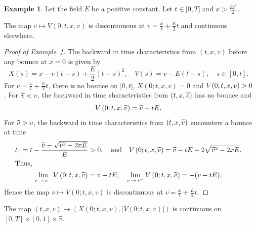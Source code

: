 \documentclass[10pt]{amsart}
\theoremstyle{definition}\newtheorem{defi}[theo]{Definition}\newtheorem{rema}[theo]{Remark}\newtheorem{exam}[theo]{Example}\newtheorem{exem}[theo]{Example}\newtheorem{nota}[theo]{Notation}
\newcommand{\R}{\mathbb{R}}
\let\oldtilde\tilde
\renewcommand*{\tilde}[1]{\mathchoice{\widetilde{#1}}{\widetilde{#1}}{\oldtilde{#1}}{\oldtilde{#1}}}
\begin{document}
\begin{exam}\label{ex-discontinuity-V(0)}
Let the field $E$ be a positive constant. Let $t\in] 0,T]$ and $x>\frac{Et^2}{2}$.

The map $v \mapsto V(0;t,x,v)$ is discontinuous at $v=\frac{x}{t}+\frac{E}{2}t$ and continuous elsewhere.
\end{exam}

\begin{proof}[{Proof of Example~\ref{ex-discontinuity-V(0)}}]
The backward in time characteristics from $(t,x,v)$ before any bounce at $x=0$ is given by
\[
X(s)= x-v(t-s)+\frac{E}{2}(t-s)^2, \quad V(s)= v-E(t-s), \quad s \in [0,t].
\]
For $v=\frac{x}{t}+\frac{E}{2}t$, there is no bounce on $]0,t]$, $X(0;t,x,v)=0$ and $V(0;t,x,v)\linebreak >0$. For $\tilde{v}<v$, the backward in time characteristics from $(t,x,\tilde{v})$ has no bounce and
\[
V\left(0;t,x,\tilde{v}\right)= \tilde{v}-tE.
\]
For $\tilde{v}>v$, the backward in time characteristics from $(t,x,\tilde{v})$ encounters a bounce at time
\begin{gather*}
t_1=t-\frac{\tilde{v}-\sqrt{\tilde{v}^2-2xE}}{E}>0,\quad \text{and}\quad V\left(0;t,x,\tilde{v}\right) = \tilde{v}-tE-2\sqrt{\tilde{v}^2-2xE}.
\\
\intertext{Thus,}
\lim _{\tilde{v}\,\to\,v^-}V\left(0;t,x,\tilde{v}\right)= v-tE, \quad \lim _{\tilde{v}\,\to\,v^+}V\left(0;t,x,\tilde{v}\right)= -(v-tE).
\end{gather*}
Hence the map $v \mapsto V(0;t,x,v)$ is discontinuous at $v=\tfrac{x}{t}+\tfrac{E}{2}t$. 
\end{proof}


\begin{prop}\label{continuite-valeur-absolueV(0)}
The map $(t,x,v) \mapsto (X(0;t,x,v),|V(0;t,x,v)|)$ is continuous on $[0,T]
\times [0,1] \times \R $.
\end{prop}
\end{document}
